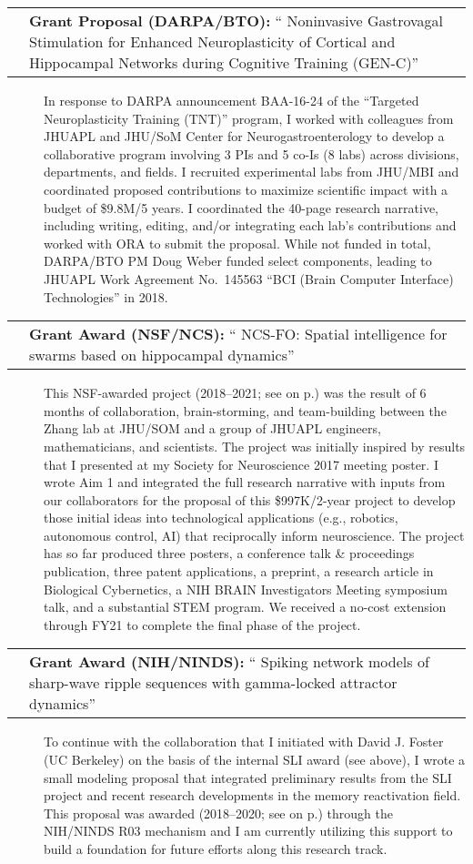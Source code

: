 \documentclass[10pt]{article}
\makeatletter
\newcommand{\unpubtitle}[1]{{\color{hopkinsblue} #1}}
\newcommand{\researchnote}[1]{
  \begin{description}
    \item[] {\hspace{2.2ex}\color{darkgray} #1}
  \end{description}
}
\newcommand{\researchactivity}[4]{
  \begin{minipage}[t]{\textwidth}
    \begin{tabular}{@{\hspace{2ex}}l>{\raggedright\arraybackslash}p{.8\textwidth}}
      \makebox[1.2in][l]{#1} & \textbf{#2:}
      ``\unpubtitle{#3}'' 
    \end{tabular}
  \researchnote{\hspace{1ex} #4}
  \end{minipage}
  \medbreak
}
\newcommand{\nameonpdot}[1]{\textcolor{hopkinsblue}{\emph{\nameref{sec:#1}} on p.\pageref{sec:#1}}}
\makeatother
\begin{document}
\researchactivity
{April--June 2016}
{Grant Proposal (DARPA/BTO)}
{Noninvasive Gastrovagal Stimulation for Enhanced Neuroplasticity of Cortical
and Hippocampal Networks during Cognitive Training (GEN-C)}
{In response to DARPA announcement BAA-16-24 of the “Targeted Neuroplasticity
  Training (TNT)” program, I worked with colleagues from JHUAPL and JHU/SoM
  Center for Neurogastroenterology to develop a collaborative program involving 3
  PIs and 5 co-Is (8 labs) across divisions, departments, and fields. I recruited
  experimental labs from JHU/MBI and coordinated proposed contributions to
  maximize scientific impact with a budget of \$9.8M/5 years. I coordinated the
  40-page research narrative, including writing, editing, and/or integrating
  each lab’s contributions and worked with ORA to submit the proposal. While
  not funded in total, DARPA/BTO PM Doug Weber funded select components, leading
  to JHUAPL Work Agreement No.~145563 “BCI (Brain Computer Interface)
Technologies” in 2018.}

\researchactivity
{Nov. 2017--2021}
{Grant Award (NSF/NCS)}
{NCS-FO: Spatial intelligence for swarms based on hippocampal dynamics}
{This NSF-awarded project (2018--2021; see \nameonpdot{nsfaward}) was the result
  of 6 months of collaboration, brain-storming, and team-building between the
  Zhang lab at JHU/SOM and a group of JHUAPL engineers, mathematicians, and
  scientists. The project was initially inspired by results that I presented at
  my Society for Neuroscience 2017 meeting poster. I wrote Aim 1 and integrated
  the full research narrative with inputs from our collaborators for the proposal
  of this \$997K/2-year project to develop those initial ideas into technological
  applications (e.g., robotics, autonomous control, AI) that reciprocally inform
  neuroscience. The project has so far produced three posters, a conference talk
  \& proceedings publication, three patent applications, a preprint, a research
  article in Biological Cybernetics, a NIH BRAIN Investigators Meeting symposium
  talk, and a substantial STEM program. We received a no-cost extension through
FY21 to complete the final phase of the project.}
\label{sec:nsfgrant}

\researchactivity
{Jan. 2018--2020}
{Grant Award (NIH/NINDS)}
{Spiking network models of sharp-wave ripple sequences with gamma-locked
attractor dynamics}
{To continue with the collaboration that I initiated with David J. Foster (UC
  Berkeley) on the basis of the internal SLI award (see above), I wrote a small
  modeling proposal that integrated preliminary results from the SLI project and
  recent research developments in the memory reactivation field. This proposal
  was awarded (2018--2020; see \nameonpdot{nihaward}) through the NIH/NINDS R03
  mechanism and I am currently utilizing this support to build a foundation for
future efforts along this research track.}
\label{sec:nihgrant}
\end{document}
